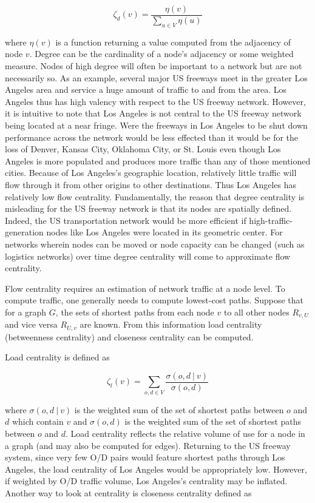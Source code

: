 \documentclass[12pt]{article}
\begin{document}
\begin{equation}
	\zeta_d(v) = \frac{\eta(v)}{\sum_{u \in V}\eta(u)}
\end{equation}

where $\eta(v)$ is a function returning a value computed from the adjacency of node $v$. Degree can be the cardinality of a node's adjacency or some weighted measure. Nodes of high degree will often be important to a network but are not necessarily so. As an example, several major US freeways meet in the greater Los Angeles area and service a huge amount of traffic to and from the area. Los Angeles thus has high valency with respect to the US freeway network. However, it is intuitive to note that Los Angeles is not central to the US freeway network being located at a near fringe. Were the freeways in Los Angeles to be shut down performance across the network would be less effected than it would be for the loss of Denver, Kansas City, Oklahoma City, or St. Louis even though Los Angeles is more populated and produces more traffic than any of those mentioned cities. Because of Los Angeles's geographic location, relatively little traffic will flow through it from other origins to other destinations. Thus Los Angeles has relatively low flow centrality. Fundamentally, the reason that degree centrality is misleading for the US freeway network is that its nodes are spatially defined. Indeed, the US transportation network would be more efficient if high-traffic-generation nodes like Los Angeles were located in its geometric center. For networks wherein nodes can be moved or node capacity can be changed (such as logistics networks) over time degree centrality will come to approximate flow centrality.

Flow centrality requires an estimation of network traffic at a node level. To compute traffic, one generally needs to compute lowest-cost paths. Suppose that for a graph $G$, the sets of shortest paths from each node $v$ to all other nodes $R_{v,U}$ and vice versa $R_{U,v}$ are known. From this information load centrality (betweenness centrality) and closeness centrality can be computed.

Load centrality is defined as

\begin{equation}
	\zeta_l(v) = \sum_{o, d \in V}\frac{\sigma(o, d\ |\ v)}{\sigma(o, d)}
\end{equation}

where $\sigma(o, d\ |\ v)$ is the weighted sum of the set of shortest paths between $o$ and $d$ which contain $v$ and $\sigma(o, d)$ is the weighted sum of the set of shortest paths between $o$ and $d$. Load centrality reflects the relative volume of use for a node in a graph (and may also be computed for edges). Returning to the US freeway system, since very few O/D pairs would feature shortest paths through Los Angeles, the load centrality of Los Angeles would be appropriately low. However, if weighted by O/D traffic volume, Los Angeles's centrality may be inflated. Another way to look at centrality is closeness centrality defined as
\end{document}
